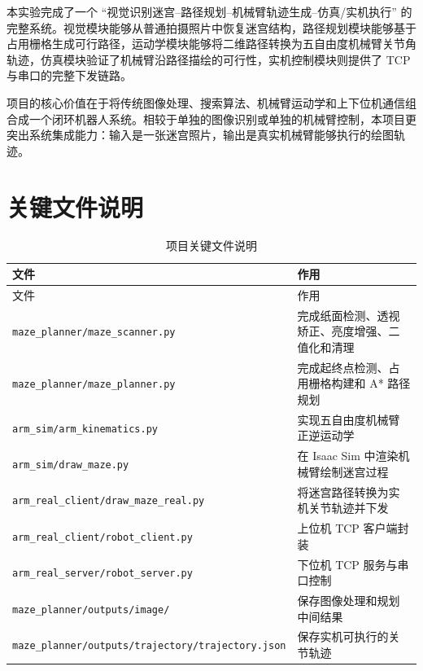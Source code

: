 \documentclass[UTF8,a4paper,12pt]{ctexart}
\begin{document}
本实验完成了一个 ``视觉识别迷宫--路径规划--机械臂轨迹生成--仿真/实机执行'' 的完整系统。视觉模块能够从普通拍摄照片中恢复迷宫结构，路径规划模块能够基于占用栅格生成可行路径，运动学模块能够将二维路径转换为五自由度机械臂关节角轨迹，仿真模块验证了机械臂沿路径描绘的可行性，实机控制模块则提供了 TCP 与串口的完整下发链路。

项目的核心价值在于将传统图像处理、搜索算法、机械臂运动学和上下位机通信组合成一个闭环机器人系统。相较于单独的图像识别或单独的机械臂控制，本项目更突出系统集成能力：输入是一张迷宫照片，输出是真实机械臂能够执行的绘图轨迹。

\appendix
\section{关键文件说明}

\begin{longtable}{p{6cm}p{8cm}}
  \caption{项目关键文件说明} \\
  \toprule
  文件 & 作用 \\
  \midrule
  \endfirsthead
  \toprule
  文件 & 作用 \\
  \midrule
  \endhead
  \texttt{maze\_planner/maze\_scanner.py} & 完成纸面检测、透视矫正、亮度增强、二值化和清理 \\
  \texttt{maze\_planner/maze\_planner.py} & 完成起终点检测、占用栅格构建和 A* 路径规划 \\
  \texttt{arm\_sim/arm\_kinematics.py} & 实现五自由度机械臂正逆运动学 \\
  \texttt{arm\_sim/draw\_maze.py} & 在 Isaac Sim 中渲染机械臂绘制迷宫过程 \\
  \texttt{arm\_real\_client/draw\_maze\_real.py} & 将迷宫路径转换为实机关节轨迹并下发 \\
  \texttt{arm\_real\_client/robot\_client.py} & 上位机 TCP 客户端封装 \\
  \texttt{arm\_real\_server/robot\_server.py} & 下位机 TCP 服务与串口控制 \\
  \texttt{maze\_planner/outputs/image/} & 保存图像处理和规划中间结果 \\
  \texttt{maze\_planner/outputs/trajectory/trajectory.json} & 保存实机可执行的关节轨迹 \\
  \bottomrule
\end{longtable}
\end{document}
